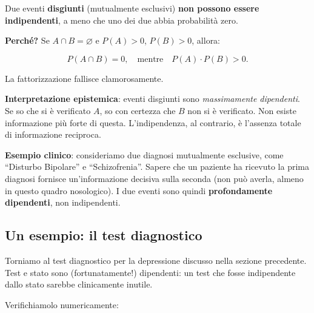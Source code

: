 \documentclass[
  italian,
  letterpaper,
  a4paper,
  11pt,
  open=any]{scrbook}
\theoremstyle{plain}
\theoremstyle{definition}
\theoremstyle{definition}
\theoremstyle{remark}
\begin{document}
\begin{tcolorbox}[enhanced jigsaw, arc=.35mm, bottomrule=.15mm, bottomtitle=1mm, breakable, colback=white, colbacktitle=quarto-callout-warning-color!10!white, colframe=quarto-callout-warning-color-frame, coltitle=black, left=2mm, leftrule=.75mm, opacityback=0, opacitybacktitle=0.6, rightrule=.15mm, title=\textcolor{quarto-callout-warning-color}{\faExclamationTriangle}\hspace{0.5em}{Un errore comune: confondere disgiunzione e indipendenza}, titlerule=0mm, toprule=.15mm, toptitle=1mm]

Due eventi \textbf{disgiunti} (mutualmente esclusivi) \textbf{non
possono essere indipendenti}, a meno che uno dei due abbia probabilità
zero.

\textbf{Perché?} Se \(A \cap B = \varnothing\) e \(P(A) > 0\),
\(P(B) > 0\), allora:

\[P(A \cap B) = 0, \quad\text{mentre}\quad P(A) \cdot P(B) > 0.\]

La fattorizzazione fallisce clamorosamente.

\textbf{Interpretazione epistemica}: eventi disgiunti sono
\emph{massimamente dipendenti}. Se so che si è verificato \(A\), so con
certezza che \(B\) non si è verificato. Non esiste informazione più
forte di questa. L'indipendenza, al contrario, è l'assenza totale di
informazione reciproca.

\textbf{Esempio clinico}: consideriamo due diagnosi mutualmente
esclusive, come ``Disturbo Bipolare'' e ``Schizofrenia''. Sapere che un
paziente ha ricevuto la prima diagnosi fornisce un'informazione decisiva
sulla seconda (non può averla, almeno in questo quadro nosologico). I
due eventi sono quindi \textbf{profondamente dipendenti}, non
indipendenti.

\end{tcolorbox}

\subsection{Un esempio: il test
diagnostico}\label{un-esempio-il-test-diagnostico}

Torniamo al test diagnostico per la depressione discusso nella sezione
precedente. Test e stato sono (fortunatamente!) dipendenti: un test che
fosse indipendente dallo stato sarebbe clinicamente inutile.

Verifichiamolo numericamente:
\end{document}
